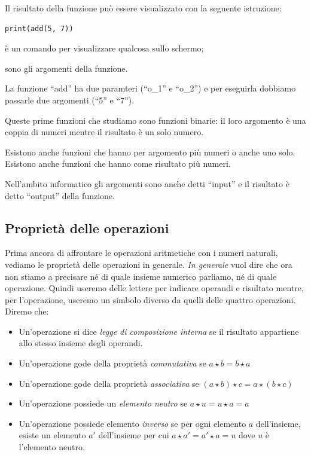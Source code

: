 Il risultato della funzione può essere visualizzato con la seguente 
istruzione:
\begin{lstlisting}
print(add(5, 7))
\end{lstlisting}
\begin{description} [nosep]
\item [\textbf{``print''}] è un comando per visualizzare qualcosa sullo 
schermo;
\item [\textbf{``5'' e ``7''}] sono gli argomenti della funzione. 
\end{description}
La funzione ``add'' ha due paramteri (``o\_1'' e ``o\_2'') e per eseguirla
dobbiamo passarle due argomenti (``5'' e ``7'').

\begin{osservazione}{}{}
Queste prime funzioni che studiamo sono funzioni binarie: il loro argomento è
una coppia di numeri mentre il risultato è un solo numero.

Esistono anche funzioni che hanno per argomento più numeri o anche uno solo.
Esistono anche funzioni che hanno come risultato più numeri.
\end{osservazione}

\begin{osservazione}{}{}
Nell'ambito informatico gli argomenti sono anche detti ``input'' e il 
risultato è detto ``output'' della funzione.
\end{osservazione}

\subsection{Proprietà delle operazioni}

Prima ancora di affrontare le operazioni aritmetiche con i numeri naturali, 
vediamo le proprietà delle operazioni in generale. \emph{In generale} vuol 
dire che ora non stiamo a precisare né di quale insieme numerico parliamo, 
né di quale operazione. Quindi useremo delle lettere per indicare  
operandi e  risultato mentre, per l'operazione, useremo un simbolo diverso 
da quelli delle quattro operazioni. Diremo che:

\begin{itemize} [noitemsep]
 \item Un'operazione si dice \emph{legge di composizione interna} se
  il risultato appartiene allo stesso insieme degli operandi.
 \item Un'operazione gode della proprietà \emph{commutativa} se 
  \(a \star b = b \star a\)
 \item Un'operazione gode della proprietà \emph{associativa} se 
  \((a \star b) \star c = a \star (b \star c)\)
 \item Un'operazione possiede un \emph{elemento neutro} se 
  \(a \star u = u \star a = a\)
 \item Un'operazione possiede elemento \emph{inverso} se per ogni
  elemento \(a\) dell'insieme, esiste un elemento \(a'\) 
  dell'insieme per cui \(a \star a' = a' \star a = u\) dove \(u\) è 
  l'elemento neutro.
\end{itemize}

